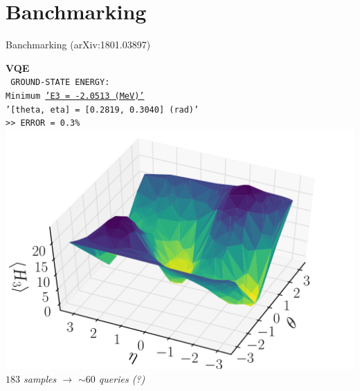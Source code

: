 \documentclass[9pt, handout, aspectratio=169]{beamer}	%
\begin{document}

\section{Banchmarking}

\begin{frame}{Banchmarking (arXiv:1801.03897)}

	\begin{multicols}{2}

		\begin{center}
			\textbf{VQE} \\
			\texttt{ \small
				GROUND-STATE ENERGY: \\
				Minimum \underline{'E3 = -2.0513 (MeV)'} \\
				'[theta, eta] = [0.2819, 0.3040] (rad)' \\
				>> ERROR = 0.3\% } \\
			\smallskip
			\includegraphics[width=.35\paperwidth]{Figures/deuteron-VQE} \\
			\smallskip
			\small{\emph{$183$ samples $\rightarrow$ $\sim 60$ queries (?)}}
		\end{center}

		\columnbreak


\end{multicols}
\end{frame}
\end{document}
